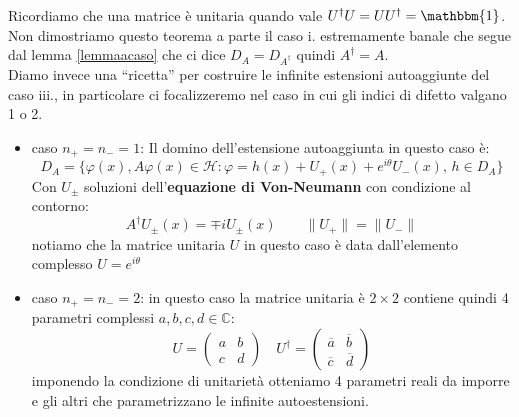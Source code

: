 \documentclass[12pt]{book}
\theoremstyle{plain}
\newcommand{\C}{\mathbb{C}}
\renewcommand{\H}{\mathcal{H}}
\theoremstyle{definition}
\theoremstyle{remark}
\begin{document}
Ricordiamo che una matrice è unitaria quando vale $U^\dagger U = U U^\dagger = \mathbbm{1}$. Non dimostriamo questo teorema a parte il caso i. estremamente banale che segue dal lemma \eqref{lemmaacaso} che ci dice $D_A = D_{A^\dagger}$ quindi $A^\dagger = A$.\\
Diamo invece una ``ricetta'' per costruire le infinite estensioni autoaggiunte del caso iii., in particolare ci focalizzeremo nel caso in cui gli indici di difetto valgano 1 o 2.
\begin{itemize}
\item caso $n_+=n_- = 1$: Il domino dell'estensione autoaggiunta in questo caso è:
\[D_A = \{\varphi(x),A\varphi(x)\in\H : \varphi = h(x) +U_+(x) + e^{i\theta}U_-(x),\,h\in D_A \}\]
Con $U_\pm$ soluzioni dell'\textbf{equazione di Von-Neumann} con condizione al contorno:
\[A^\dagger U_\pm(x) = \mp i U_\pm(x)\qquad \|U_+\| = \|U_-\|\]
notiamo che la matrice unitaria $U$ in questo caso è data dall'elemento complesso $U=e^{i\theta}$
\item caso $n_+=n_- = 2$: in questo caso la matrice unitaria è $2\times2$ contiene quindi 4 parametri complessi $a,b,c,d\in\C$:
\[U = \begin{pmatrix}
  a & b \\
  c & d
 \end{pmatrix} \quad
	U^\dagger = \begin{pmatrix}
  \overline{a} & \overline{b} \\
  \overline{c} & \overline{d}
 \end{pmatrix}
 \]
imponendo la condizione di unitarietà otteniamo 4 parametri reali da imporre e gli altri che parametrizzano le infinite autoestensioni.%
\end{itemize}
\end{document}
